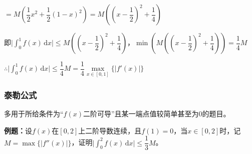 \documentclass[UTF8, 12pt]{ctexart}
\begin{document}
$=M\left(\dfrac{1}{2}x^2+\dfrac{1}{2}(1-x)^2\right)=M\left(\left(x-\dfrac{1}{2}\right)^2+\dfrac{1}{4}\right)$

即$\vert\int_0^1f(x)\,\textrm{d}x\vert\leqslant M\left(\left(x-\dfrac{1}{2}\right)^2+\dfrac{1}{4}\right)$，$\min\left(M\left(\left(x-\dfrac{1}{2}\right)^2+\dfrac{1}{4}\right)\right)=\dfrac{1}{4}M$

$\therefore\vert\int_0^1f(x)\,\textrm{d}x\vert\leqslant\dfrac{1}{4}M=\dfrac{1}{4}\max\limits_{x\in[0,1]}\{\vert f'(x)\vert\}$

\subsubsection{泰勒公式}

多用于所给条件为“$f(x)$二阶可导”且某一端点值较简单甚至为0的题目。

\textbf{例题：}设$f(x)$在$[0,2]$上二阶导数连续，且$f(1)=0$，当$x\in[0,2]$时，记$M=\max\{\vert f''(x)\vert\}$，证明$\vert\int_0^2f(x)\,\textrm{d}x\vert\leqslant\dfrac{1}{3}M$。
\end{document}
